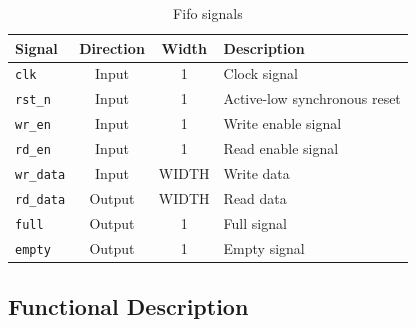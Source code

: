 \begin{table}[h!]
    \centering
    \begin{tabular}{|l|c|c|l|}
        \hline
        \textbf{Signal}     & \textbf{Direction} & \textbf{Width} & \textbf{Description}            \\ \hline
        \texttt{clk}        & Input              & 1              & Clock signal                    \\ \hline
        \texttt{rst\_n}     & Input              & 1              & Active-low synchronous reset    \\ \hline
        \texttt{wr\_en}     & Input              & 1              & Write enable signal             \\ \hline
        \texttt{rd\_en}     & Input              & 1              & Read enable signal              \\ \hline
        \texttt{wr\_data}   & Input              & WIDTH          & Write data                      \\ \hline
        \texttt{rd\_data}   & Output             & WIDTH          & Read data                       \\ \hline
        \texttt{full}       & Output             & 1              & Full signal                     \\ \hline
        \texttt{empty}      & Output             & 1              & Empty signal                    \\ \hline
    \end{tabular}
    \caption{Fifo signals}

\end{table}

\subsection{Functional Description}


